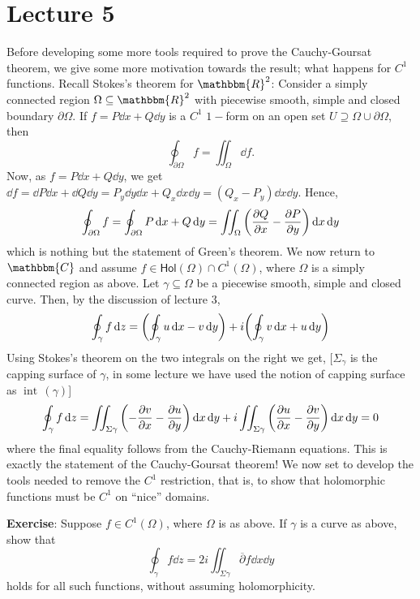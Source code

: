 \documentclass[../ComplexAnalysis_Notes.tex]{subfiles}
\begin{document}
\chapter*{Lecture 5} %
\setcounter{chapter}{5} %
\setcounter{section}{0}
\setcounter{equation}{0}
\setcounter{figure}{0}

Before developing some more tools required to prove the Cauchy-Goursat theorem, we give some more motivation towards the result; what happens for \( C^1 \) functions. Recall Stokes's theorem for \( \mathbbm{R}^2 \): Consider a simply connected region \( \Omega \subseteq \mathbbm{R}^2 \) with piecewise smooth, simple and closed boundary \( \partial \Omega \). If \( f = P \dd{x} + Q \dd{y} \) is a \( C^1 \) \( 1- \)form on an open set \( U \supseteq \Omega \cup \partial \Omega  \), then
\[ 
 \oint_{\partial \Omega} f = \iint_{\Omega}\dd{f}.
 \]
Now, as \( f = P \dd{x} + Q \dd{y} \), we get \( \dd{f} = \dd{P} \dd{x} + \dd{Q} \dd{y} = P_y \dd{y}\dd{x} + Q_x \dd{x}\dd{y} = (Q_x-P_y)\dd{x}\dd{y} \). Hence,
\[ 
  \oint_{\partial \Omega} f = \oint_{\partial \Omega} P \dd{x} + Q \dd{y} = \iint_\Omega \qty(\pdv{Q}{x} - \pdv{P}{y}) \dd{x} \dd{y}
 \]
which is nothing but the statement of Green's theorem. We now return to \( \mathbbm{C} \) and assume \( f \in \textsf{Hol}(\Omega) \cap C^1(\Omega) \), where \( \Omega \) is a simply connected region as above. Let \( \gamma \subseteq \Omega \) be a piecewise smooth, simple and closed curve. Then, by the discussion of lecture 3,
\[ 
 \oint_\gamma f \dd{z} = \qty(\oint_\gamma u \dd{x} - v \dd{y}) + i\qty(\oint_\gamma v \dd{x} + u \dd{y}) 
 \]
 Using Stokes's theorem on the two integrals on the right we get, [$\Sigma_{\gamma}$ is the capping surface of $\gamma$, in some lecture we have used the notion of capping surface as $\operatorname{int}\, (\gamma)$]
 \[ 
  \oint_\gamma f \dd{z} = \iint_{\Sigma \gamma} \qty(-\pdv{v}{x}-\pdv{u}{y})\dd{x}\dd{y} + i \iint_{\Sigma \gamma} \qty(\pdv{u}{x}-\pdv{v}{y})\dd{x}\dd{y} = 0
  \]
  where the final equality follows from the Cauchy-Riemann equations. This is exactly the statement of the Cauchy-Goursat theorem! We now set to develop the tools needed to remove the \( C^1 \) restriction, that is, to show that holomorphic functions must be \( C^1 \) on ``nice'' domains.

\textbf{Exercise}: Suppose \( f \in C^1(\Omega) \), where \( \Omega \) is as above. If \( \gamma \) is a curve as above, show that
\[ 
 \oint_\gamma f \dd{z} = 2i \iint_{\Sigma \gamma} \overline{\partial}f \dd{x}\dd{y}
 \]
holds for all such functions, without assuming holomorphicity.
\medskip
\end{document}
